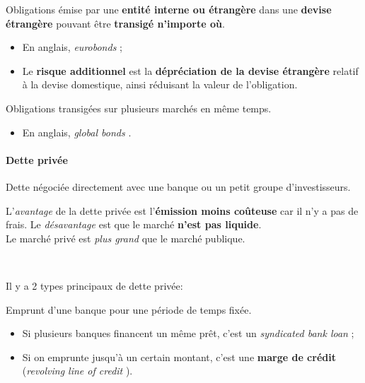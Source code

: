 \documentclass[10pt, french]{article}
\begin{document}
\begin{multicols*}{2}
\begin{definitionNOHFILLprop}
Obligations émise par une \textbf{entité interne ou étrangère} dans une \textbf{devise étrangère} pouvant être \textbf{transigé n'importe où}.
\begin{itemize}
	\item	En anglais, \og \textit{eurobonds} \fg{} ;
	\item	Le \textbf{risque additionnel} est la \textbf{dépréciation de la devise étrangère} relatif à la devise domestique, ainsi réduisant la valeur de l'obligation.
\end{itemize}
\end{definitionNOHFILLprop}

\begin{definitionNOHFILLprop}
Obligations transigées sur plusieurs marchés en même temps.
\begin{itemize}
	\item	En anglais, \og \textit{global bonds} \fg{}.
\end{itemize}
\end{definitionNOHFILLprop}


\paragraph{Dette privée}	Dette négociée directement avec une banque ou un petit groupe d'investisseurs.
\begin{rappel_enhanced}[Contexte]
L'\textit{avantage} de la dette privée est l'\textbf{émission moins coûteuse} car il n'y a pas de frais. Le \textit{désavantage} est que le marché \textbf{n'est pas liquide}.\\

Le marché privé est \textit{plus grand} que le marché publique.
\end{rappel_enhanced}

\

Il y a 2 types principaux de dette privée: 

\begin{definitionNOHFILLpropos}
Emprunt d'une banque pour une période de temps fixée.
\begin{itemize}
	\item	Si plusieurs banques financent un même prêt, c'est un \og \textit{syndicated bank loan} \fg{} ;
	\item	Si on emprunte jusqu'à un certain montant, c'est une \textbf{marge de crédit} (\og \textit{revolving line of credit} \fg{}).
\end{itemize}
\end{definitionNOHFILLpropos}


\end{multicols*}
\end{document}
